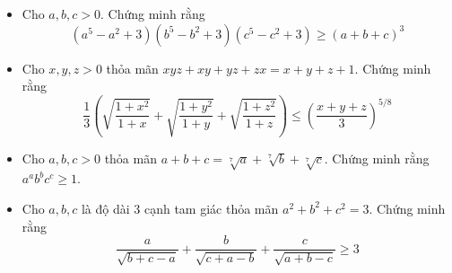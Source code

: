 \documentclass[11pt]{scrartcl}
\begin{document}
\begin{itemize}[label=, leftmargin=0em, itemsep=-0em]
        \item \begin{btvn}
            Cho $a,b,c >0$. Chứng minh rằng
            \[
                (a^5 - a^2 + 3)(b^5 - b^2 + 3)(c^5 - c^2 + 3) \geq (a + b + c)^3
            \]
        \end{btvn}
        \item \begin{btvn}
            Cho $x,y,z >0$ thỏa mãn $xyz + xy + yz + zx  = x + y + z + 1$. Chứng minh rằng
            \[
                \frac{1}{3}\left(\sqrt{\frac{1 + x^2}{1 + x}} + \sqrt{\frac{1 + y^2}{1 + y}} + \sqrt{\frac{1 + z^2}{1 + z}}\right) \leq \left(\frac{x + y + z}{3}\right)^{5/8}
            \]
        \end{btvn}
        \item \begin{btvn}
            Cho $a,b,c > 0$ thỏa mãn $a + b + c = \sqrt[7]{a} + \sqrt[7]{b} + \sqrt[7]{c}$. Chứng minh rằng $a^ab^bc^c \geq 1$.
        \end{btvn}
        \item\begin{btvn}
            Cho $a,b,c$ là độ dài 3 cạnh tam giác thỏa mãn $a^2 + b^2 + c^2 = 3$. Chứng minh rằng
            \[
                \frac{a}{\sqrt{b + c -a}} + \frac{b}{\sqrt{c + a -b}} + \frac{c}{\sqrt{a + b -c}} \geq 3
            \]
            

\end{btvn}
\end{itemize}
\end{document}
